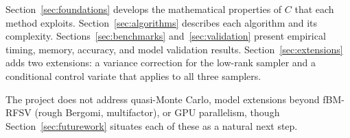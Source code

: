 Section~\ref{sec:foundations} develops the mathematical properties of $C$ that each
method exploits.  Section~\ref{sec:algorithms} describes each algorithm and its
complexity.  Sections~\ref{sec:benchmarks} and~\ref{sec:validation} present empirical
timing, memory, accuracy, and model validation results.  Section~\ref{sec:extensions}
adds two extensions: a variance correction for the low-rank sampler and a conditional
control variate that applies to all three samplers.

The project does not address quasi-Monte Carlo, model extensions beyond fBM-RFSV
(rough Bergomi, multifactor), or GPU parallelism, though Section~\ref{sec:futurework}
situates each of these as a natural next step.

